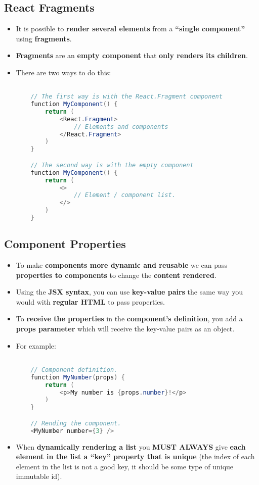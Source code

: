 \documentclass{article}
\begin{document}
    \subsection*{React Fragments}
    \begin{itemize}
        \item It is possible to \textbf{render several elements} from a \textbf{``single component''} using \textbf{fragments}.
        \item \textbf{Fragments} are an \textbf{empty component} that \textbf{only renders its children}.
        \item There are two ways to do this:
        \begin{lstlisting}[language=Java]

    // The first way is with the React.Fragment component
    function MyComponent() {
        return (
            <React.Fragment>
                // Elements and components
            </React.Fragment>
        )
    }

    // The second way is with the empty component
    function MyComponent() {
        return (
            <>
                // Element / component list.
            </>
        )
    }
        \end{lstlisting}
    \end{itemize}

    \subsection*{Component Properties}
    \begin{itemize}
        \item To make \textbf{components more dynamic and reusable} we can pass \textbf{properties to components} to change the \textbf{content rendered}.
        \item Using the \textbf{JSX syntax}, you can use \textbf{key-value pairs} the same way you would with \textbf{regular HTML} to pass properties.
        \item To \textbf{receive the properties} in the \textbf{component's definition}, you add a \textbf{props parameter} which will receive the key-value pairs as an object.
        \item For example:
        \begin{lstlisting}[language=Java]

    // Component definition.
    function MyNumber(props) {
        return (
            <p>My number is {props.number}!</p>
        )
    }

    // Rending the component.
    <MyNumber number={3} />
        \end{lstlisting}
        \item When \textbf{dynamically rendering a list} you \textbf{MUST ALWAYS} give \textbf{each element in the list a ``key'' property that is unique} (the index of each element in the list is not a good key, it should be some type of unique immutable id).
    \end{itemize}
\end{document}

